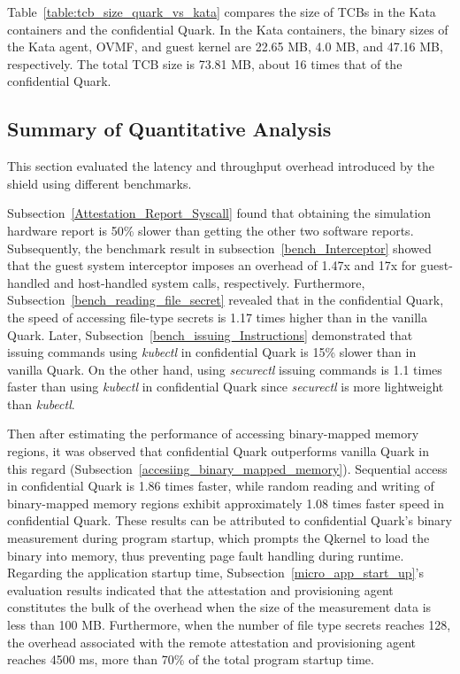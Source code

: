Table~\ref{table:tcb_size_quark_vs_kata} compares the size of \acrshort{TCB}s in the Kata containers and the confidential Quark. In the Kata containers, the binary sizes of the Kata agent, OVMF, and guest kernel are 22.65 MB, 4.0 MB, and 47.16 MB, respectively. The total \acrshort{TCB} size is 
73.81 MB, about 16 times that of the confidential Quark.

\subsection{Summary of Quantitative Analysis}
\label{sec:qualitativ_sum}
This section evaluated the latency and throughput overhead introduced by the shield using different benchmarks.

Subsection~\ref{Attestation_Report_Syscall} found that obtaining the simulation hardware report is 50\% slower than getting the other two software reports. Subsequently, the benchmark result in subsection~\ref*{bench_Interceptor} showed that the guest system interceptor 
imposes an overhead of 1.47x and 17x for guest-handled and host-handled system calls, respectively. Furthermore, Subsection~\ref{bench_reading_file_secret} revealed that in the confidential Quark, the speed of accessing file-type secrets is 1.17 times higher than in the vanilla Quark.
Later, Subsection~\ref{bench_issuing_Instructions} demonstrated that issuing commands using \emph{kubectl} in confidential Quark is 15\% slower than in vanilla Quark. On the other hand, using \emph{securectl} issuing commands is 1.1 times faster than using \emph{kubectl} in confidential 
Quark since \emph{securectl} is more lightweight than \emph{kubectl}.

Then after estimating the performance of accessing binary-mapped memory regions, it was observed that confidential Quark outperforms vanilla Quark in this regard (Subsection~\ref{accesiing_binary_mapped_memory}). Sequential access in confidential Quark is 1.86 times faster, while random reading and 
writing of binary-mapped memory regions exhibit approximately 1.08 times faster speed in confidential Quark. These results can be attributed to confidential Quark’s binary measurement during program startup, which prompts the Qkernel to load the binary into memory, 
thus preventing page fault handling during runtime. Regarding the application startup time, Subsection~\ref*{micro_app_start_up}’s evaluation results indicated that the attestation and provisioning agent constitutes the bulk of the overhead when the size of the measurement data is less than 100 MB. 
Furthermore, when the number of file type secrets reaches 128, the overhead associated with the remote attestation and provisioning agent reaches 4500 ms, more than 70\% of the total program startup time.

